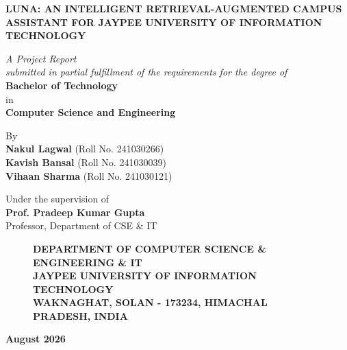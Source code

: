 \documentclass[12pt,a4paper]{article}
\begin{document}
\begin{titlepage}
    \begin{center}
        \vspace*{0.5cm}
        
        \textbf{\Large LUNA: AN INTELLIGENT RETRIEVAL-AUGMENTED CAMPUS ASSISTANT FOR JAYPEE UNIVERSITY OF INFORMATION TECHNOLOGY}
        
        \vspace{1.5cm}
        
        \textit{A Project Report} \\
        \textit{submitted in partial fulfillment of the requirements for the degree of} \\
        \textbf{Bachelor of Technology} \\
        in \\
        \textbf{Computer Science and Engineering}
        
        \vspace{1.5cm}
        
        By \\
        \vspace{0.3cm}
        \textbf{Nakul Lagwal} (Roll No. 241030266) \\
        \textbf{Kavish Bansal} (Roll No. 241030039) \\
        \textbf{Vihaan Sharma} (Roll No. 241030121) \\
        
        \vspace{1.5cm}
        
        Under the supervision of \\
        \vspace{0.3cm}
        \textbf{Prof. Pradeep Kumar Gupta} \\
        Professor, Department of CSE \& IT
        
        \vfill
        
        \begin{figure}[h!]
            \centering
            \textbf{DEPARTMENT OF COMPUTER SCIENCE \& ENGINEERING \& IT} \\
            \textbf{JAYPEE UNIVERSITY OF INFORMATION TECHNOLOGY} \\
            \textbf{WAKNAGHAT, SOLAN - 173234, HIMACHAL PRADESH, INDIA}
        \end{figure}
        
        \vspace{0.8cm}
        \textbf{August 2026}
        
    \end{center}
\end{titlepage}
\end{document}
